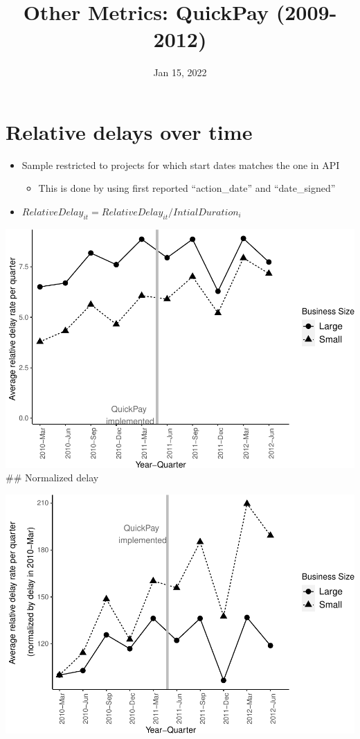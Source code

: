 \documentclass[
]{article}
\title{Other Metrics: QuickPay (2009-2012)}
\author{}
\date{\vspace{-2.5em}Jan 15, 2022}
\providecommand{\tightlist}{%
  \setlength{\itemsep}{0pt}\setlength{\parskip}{0pt}}
\begin{document}
\maketitle

\hypertarget{relative-delays-over-time}{%
\section{Relative delays over time}\label{relative-delays-over-time}}

\begin{itemize}
\tightlist
\item
  Sample restricted to projects for which start dates matches the one in
  API

  \begin{itemize}
  \tightlist
  \item
    This is done by using first reported ``action\_date'' and
    ``date\_signed''
  \end{itemize}
\item
  \(RelativeDelay_{it} = RelativeDelay_{it}/IntialDuration_i\)
\end{itemize}

\includegraphics{qp_first_relative_delay_files/figure-latex/plot_relative_delay-1.pdf}
\#\# Normalized delay

\includegraphics{qp_first_relative_delay_files/figure-latex/normalized_plot-1.pdf}
\end{document}
